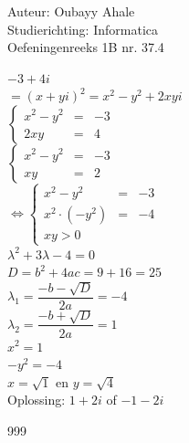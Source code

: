 \documentclass[a4paper]{article}
\begin{document}
  
\noindent \large Auteur: Oubayy Ahale          \\
\noindent \large Studierichting: Informatica   \\ 
\noindent \large Oefeningenreeks 1B nr. 37.4   \\

\medskip

\normalsize

$ -3 + 4i $\\

$ = (x + yi)^2 = x^2 - y^2 + 2xyi $\\

$\left\{
    \begin{array}{lll} 
        x^2 - y^2 &=& -3 \\
        2xy &=& 4
    \end{array}
\right .$\\

$\left\{
    \begin{array}{lll} 
        x^2 - y^2 &=& -3 \\
        xy &=& 2
    \end{array}
\right .$\\

$\Leftrightarrow \left\{
    \begin{array}{lll} 
        x^2 - y^2 &=& -3 \\
        x^2 \cdot (-y^2) &=& -4 \\
        xy > 0
    \end{array}
\right .$\\

$ \lambda^2 + 3\lambda - 4 = 0 $ \\

$ D = b^2 + 4ac = 9 + 16 = 25          $\\

$ \lambda_1 = \dfrac{-b - \sqrt{D}}{2a} = -4 $\\

$ \lambda_2 = \dfrac{-b + \sqrt{D}}{2a} = 1  $\\

$ x^2 = 1 $ \\

$ -y^2 = -4 $ \\

$ x = \sqrt{1} $ en $ y = \sqrt{4} $\\

Oplossing: $ 1 + 2i $ of $ -1 - 2i $

\begin{thebibliography}{999}
\end{thebibliography}
\end{document}
